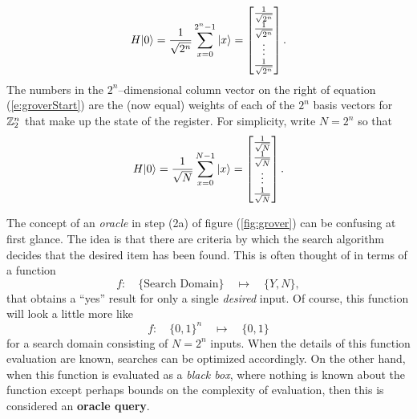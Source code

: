 \begin{equation}
H{|{0}\rangle} = \frac{1}{\sqrt{2^n}}\sum_{x=0}^{2^n-1}{|{x}\rangle} 
= 
  \left[ \begin{matrix}
            \frac{1}{\sqrt{2^n}}\\
            \frac{1}{\sqrt{2^n}}\\
            \vdots\\
            \frac{1}{\sqrt{2^n}}
         \end{matrix} 
  \right].
\label{e:groverStart}
\end{equation}
The numbers in the $2^n$--dimensional column vector on the right 
of equation (\ref{e:groverStart}) are the (now equal) weights of each 
of the $2^n$ basis vectors for ${\mathbb{Z}}_2^n$ that make up the state of the
register.
For simplicity, write $N=2^n$ so that
\begin{equation}
H{|{0}\rangle} = \frac{1}{\sqrt{N}}\sum_{x=0}^{N-1}{|{x}\rangle} 
= \left[ \begin{matrix}
            \frac{1}{\sqrt{N}}\\
            \frac{1}{\sqrt{N}}\\
            \vdots\\
            \frac{1}{\sqrt{N}}
         \end{matrix} 
  \right].
\end{equation}

The concept of an \emph{oracle} in step (2a) of figure (\ref{fig:grover}) 
can be confusing at first glance.  The idea is that there are criteria
by which the search algorithm decides that the desired item has been found.
This is often thought of in terms of a function
\begin{equation}
f\colon\quad\lbrace\mbox{Search Domain}\rbrace\quad\mapsto\quad\lbrace Y,N\rbrace,
\end{equation}
that obtains a ``yes'' result for only a single {\sl desired} input.
Of course, this function will look a little more like 
\begin{equation}
f\colon\quad\lbrace 0,1\rbrace^n\quad\mapsto\quad\lbrace 0,1\rbrace
\end{equation}
for a search domain consisting of $N=2^n$ inputs.
When the details of this function evaluation are known, searches can
be optimized accordingly.  On the other hand, when this function is 
evaluated as a \emph{black box}, where nothing is known about the function 
except perhaps bounds on the complexity of evaluation, then this is 
considered an \textbf{oracle query}.

